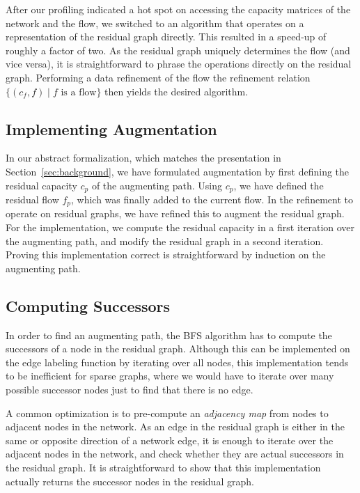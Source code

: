 \documentclass{llncs}
\begin{document}
  After our profiling indicated a hot spot on accessing the capacity matrices of the network and the flow, we switched to 
  an algorithm that operates on a representation of the residual graph directly. This resulted in a speed-up of roughly a factor of two.
  As the residual graph uniquely determines the flow (and vice versa), it is straightforward to phrase the
  operations directly on the residual graph. Performing a data refinement of the flow \wrt the refinement 
  relation $\{(c_f,f) \mid \text{$f$ is a flow}\}$ then yields the desired algorithm.
      
  \subsection{Implementing Augmentation}    
  In our abstract formalization, which matches the presentation in Section~\ref{sec:background}, we have formulated augmentation by first defining 
  the residual capacity $c_p$ of the augmenting path. Using $c_p$, we have defined the residual flow $f_p$, which was finally added to the current flow.
  In the refinement to operate on residual graphs, we have refined this to augment the residual graph.
  For the implementation, we compute the residual capacity in a first iteration over the augmenting path, and modify the residual graph 
  in a second iteration. Proving this implementation correct is straightforward by induction on the augmenting path.
      
  \subsection{Computing Successors}
  In order to find an augmenting path, the BFS algorithm has to compute the successors of a node in the residual graph. 
  Although this can be implemented on the edge labeling function by iterating over all nodes, this implementation tends to be inefficient for sparse graphs,
  where we would have to iterate over many possible successor nodes just to find that there is no edge. 
  
  A common optimization is to pre-compute an \emph{adjacency map} from nodes to adjacent nodes in the network. 
  As an edge in the residual graph is either in the same or opposite direction of 
  a network edge, it is enough to iterate over the adjacent nodes in the network, and check whether they are actual successors in the residual graph.
  It is straightforward to show that this implementation actually returns the successor nodes in the residual graph.
\end{document}

